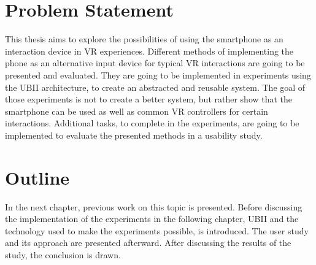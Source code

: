\section{Problem Statement}\label{section:problem-statement}
This thesis aims to explore the possibilities of using the smartphone as an interaction device in \ac{VR} experiences. Different methods of implementing the phone as an alternative input device for typical \ac{VR} interactions are going to be presented and evaluated. They are going to be implemented in experiments using the \ac{UBII} architecture, to create an abstracted and reusable system. The goal of those experiments is not to create a better system, but rather show that the smartphone can be used as well as common \ac{VR} controllers for certain interactions. Additional tasks, to complete in the experiments, are going to be implemented to evaluate the presented methods in a usability study.


\section{Outline}\label{section:outline}
In the next chapter, previous work on this topic is presented. Before discussing the implementation of the experiments in the following chapter, \ac{UBII} and the technology used to make the experiments possible, is introduced. The user study and its approach are presented afterward. After discussing the results of the study, the conclusion is drawn.